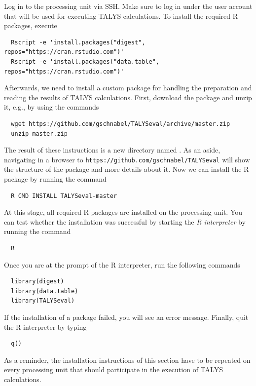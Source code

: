 \documentclass[12pt,a4paper]{scrartcl}
\begin{document}
Log in to the processing unit via SSH.
Make sure to log in under the user account that will be used for executing  TALYS calculations.
To install the required R packages, execute
\begin{verbatim}
  Rscript -e 'install.packages("digest", repos="https://cran.rstudio.com")'
  Rscript -e 'install.packages("data.table", repos="https://cran.rstudio.com")'
\end{verbatim}
Afterwards, we need to install a custom package for handling the preparation and reading the results of TALYS calculations.
First, download the package and unzip it, e.g., by using the commands
\begin{verbatim}
  wget https://github.com/gschnabel/TALYSeval/archive/master.zip
  unzip master.zip
\end{verbatim}
The result of these instructions is a new directory named .
As an aside, navigating in a browser to \verb#https://github.com/gschnabel/TALYSeval# will show the structure of the package and more details about it.
Now we can install the R package by running the command
\begin{verbatim}
  R CMD INSTALL TALYSeval-master
\end{verbatim}
At this stage, all required R packages are installed on the processing unit.
You can test whether the installation was successful by starting the \textit{R interpreter} by running the command
\begin{verbatim}
  R
\end{verbatim}
Once you are at the prompt of the R interpreter, run the following commands
\begin{verbatim}
  library(digest)
  library(data.table)
  library(TALYSeval)
\end{verbatim}
If the installation of a package failed, you will see an error message.
Finally, quit the R interpreter by typing
\begin{verbatim}
  q()
\end{verbatim}
As a reminder, the installation instructions of this section have to be repeated on every processing unit that should participate in the execution of TALYS calculations.
\end{document}
